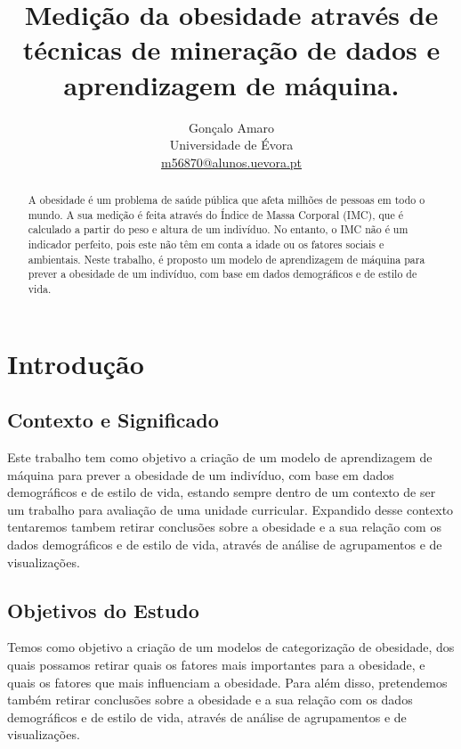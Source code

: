 \documentclass{easychair}
\begin{document}
\title{Medição da obesidade através de técnicas de mineração de dados e aprendizagem de máquina.}

\titlerunning{ }

\author{Gonçalo Amaro\\
  Universidade de Évora\\
  \url{m56870@alunos.uevora.pt}\\
}


\maketitle

\begin{abstract}
A obesidade é um problema de saúde pública que afeta milhões de pessoas em todo o mundo. A sua medição é feita através do Índice de Massa Corporal (IMC), que é calculado a partir do peso e altura de um indivíduo. No entanto, o IMC não é um indicador perfeito, pois este não têm em conta a idade ou os fatores sociais e ambientais. Neste trabalho, é proposto um modelo de aprendizagem de máquina para prever a obesidade de um indivíduo, com base em dados demográficos e de estilo de vida.
\end{abstract}

\section{Introdução}

\subsection{Contexto e Significado}

Este trabalho tem como objetivo a criação de um modelo de aprendizagem de máquina para prever a obesidade de um indivíduo, com base em dados demográficos e de estilo de vida, estando sempre dentro de um contexto de ser um trabalho para avaliação de uma unidade curricular. Expandido desse contexto tentaremos tambem retirar conclusões sobre a obesidade e a sua relação com os dados demográficos e de estilo de vida, através de análise de agrupamentos e de visualizações.

\subsection{Objetivos do Estudo}

Temos como objetivo a criação de um modelos de categorização de obesidade, dos quais possamos retirar quais os fatores mais importantes para a obesidade, e quais os fatores que mais influenciam a obesidade. Para além disso, pretendemos também retirar conclusões sobre a obesidade e a sua relação com os dados demográficos e de estilo de vida, através de análise de agrupamentos e de visualizações.
\end{document}
